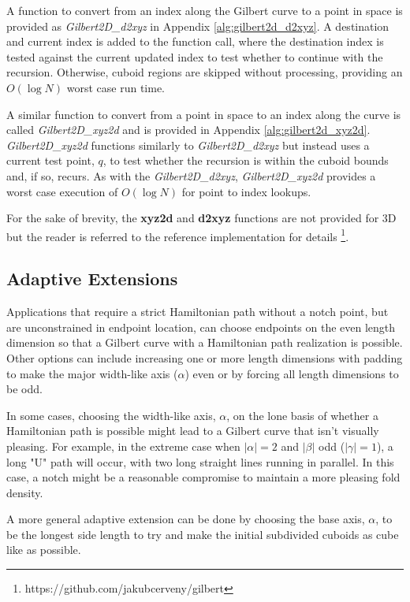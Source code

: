 A function to convert from an index along the Gilbert curve to a point in space is provided as \textit{Gilbert2D\_d2xyz} in Appendix \ref{alg:gilbert2d_d2xyz}.
A destination and current index is added to the function call, where the destination index is tested
against the current updated index to test whether to continue with the recursion.
Otherwise, cuboid regions are skipped without processing, providing an $O( \log N )$ worst case run time.

A similar function to convert from a point in space to an index along the curve is called \textit{Gilbert2D\_xyz2d} and is provided in Appendix \ref{alg:gilbert2d_xyz2d}.
\textit{Gilbert2D\_xyz2d} functions similarly to \textit{Gilbert2D\_d2xyz} but instead uses a current test point, $q$, to
test whether the recursion is within the cuboid bounds and, if so, recurs.
As with the \textit{Gilbert2D\_d2xyz}, \textit{Gilbert2D\_xyz2d} provides a worst case execution of
$O( \log N )$ for point to index lookups.

For the sake of brevity, the \textbf{xyz2d} and \textbf{d2xyz} functions are not provided for 3D but the reader is referred to
the reference implementation for details \footnote{ https://github.com/jakubcerveny/gilbert }.

\subsection{Adaptive Extensions}

Applications that require a strict Hamiltonian path without a notch point, but are unconstrained in endpoint location, can choose
endpoints on the even length dimension so that a Gilbert curve with a Hamiltonian path realization is possible.
Other options can include increasing one or more length dimensions with padding to make the major width-like axis ($\alpha$) even or
by forcing all length dimensions to be odd.

In some cases, choosing the width-like axis, $\alpha$, on the lone basis of whether a Hamiltonian path is possible might lead
to a Gilbert curve that isn't visually pleasing.
For example, in the extreme case when $|\alpha|=2$ and $|\beta|$ odd ($|\gamma|=1$), a long "U" path will occur,
with two long straight lines running in parallel.
In this case, a notch might be a reasonable compromise to maintain a more pleasing fold density.

A more general adaptive extension can be done by choosing the base axis, $\alpha$, to be the longest side length to try
and make the initial subdivided cuboids as cube like as possible.


